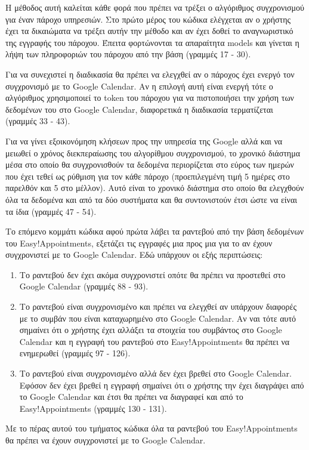 

Η μέθοδος αυτή καλείται κάθε φορά που πρέπει να τρέξει ο αλγόριθμος συγχρονισμού για έναν πάροχο υπηρεσιών. Στο πρώτο μέρος του κώδικα ελέγχεται αν ο χρήστης έχει τα δικαιώματα να τρέξει αυτήν την μέθοδο και αν έχει δοθεί το αναγνωριστικό της εγγραφής του πάροχου. Έπειτα φορτώνονται τα απαραίτητα models και γίνεται η λήψη των πληροφοριών του πάροχου από την βάση (γραμμές 17 - 30). 

Για να συνεχιστεί η διαδικασία θα πρέπει να ελεγχθεί αν ο πάροχος έχει ενεργό τον συγχρονισμό με το Google Calendar. Αν η επιλογή αυτή είναι ενεργή τότε ο αλγόριθμος χρησιμοποιεί το token του πάροχου για να πιστοποιήσει την χρήση των δεδομένων του στο Google Calendar, διαφορετικά η διαδικασία τερματίζεται (γραμμές 33 - 43). 

Για να γίνει εξοικονόμηση κλήσεων προς την υπηρεσία της Google αλλά και να μειωθεί ο χρόνος διεκπεραίωσης του αλγορίθμου συγχρονισμού, το χρονικό διάστημα μέσα στο οποίο θα συγχρονισθούν τα δεδομένα περιορίζεται στο εύρος των ημερών που έχει τεθεί ως ρύθμιση για τον κάθε πάροχο (προεπιλεγμένη τιμή 5 ημέρες στο παρελθόν και 5 στο μέλλον). Αυτό είναι το χρονικό διάστημα στο οποίο θα ελεγχθούν όλα τα δεδομένα και από τα δύο συστήματα και θα συντονιστούν έτσι ώστε να είναι τα ίδια (γραμμές 47 - 54).

Το επόμενο κομμάτι κώδικα αφού πρώτα λάβει τα ραντεβού από την βάση δεδομένων του Easy!Appointments, εξετάζει τις εγγραφές μια προς μια για το αν έχουν συγχρονιστεί με το Google Calendar. Εδώ υπάρχουν οι εξής περιπτώσεις:
\begin{enumerate}
\item Το ραντεβού δεν έχει ακόμα συγχρονιστεί οπότε θα πρέπει να προστεθεί στο Google Calendar (γραμμές 88 - 93).
\item Το ραντεβού είναι συγχρονισμένο και πρέπει να ελεγχθεί αν υπάρχουν διαφορές με το συμβάν που είναι καταχωρημένο στο Google Calendar. Αν ναι τότε αυτό σημαίνει ότι ο χρήστης έχει αλλάξει τα στοιχεία του συμβάντος στο Google Calendar και η εγγραφή του ραντεβού στο Easy!Appointments θα πρέπει να ενημερωθεί (γραμμές 97 - 126).
\item Το ραντεβού είναι συγχρονισμένο αλλά δεν έχει βρεθεί στο Google Calendar. Εφόσον δεν έχει βρεθεί η εγγραφή σημαίνει ότι ο χρήστης την έχει διαγράψει από το Google Calendar και έτσι θα πρέπει να διαγραφεί και από το Easy!Appointments (γραμμές 130 - 131).
\end{enumerate}
Με το πέρας αυτού του τμήματος κώδικα όλα τα ραντεβού του Easy!Appointments θα πρέπει να έχουν συγχρονιστεί με το Google Calendar.

